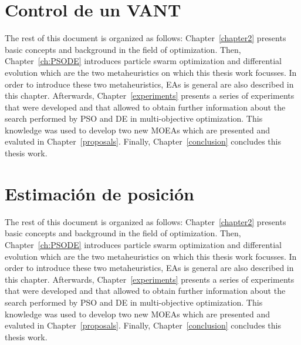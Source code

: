 \section{Control de un VANT}

The rest of this document is organized as follows: Chapter~\ref{chapter2} presents basic concepts and background in the field of optimization. Then, Chapter~\ref{ch:PSODE} introduces particle swarm optimization and differential evolution which are the two metaheuristics on which this thesis work focusses. In order to introduce these two metaheuristics, EAs is general are also described in this chapter. Afterwards, Chapter~\ref{experiments} presents a series of experiments that were developed and that allowed to obtain further information about the search performed by PSO and DE in multi-objective optimization. This knowledge was used to develop two new MOEAs which are presented and evaluted in Chapter~\ref{proposals}. Finally, Chapter~\ref{conclusion} concludes this thesis work.

\section{Estimación de posición}

The rest of this document is organized as follows: Chapter~\ref{chapter2} presents basic concepts and background in the field of optimization. Then, Chapter~\ref{ch:PSODE} introduces particle swarm optimization and differential evolution which are the two metaheuristics on which this thesis work focusses. In order to introduce these two metaheuristics, EAs is general are also described in this chapter. Afterwards, Chapter~\ref{experiments} presents a series of experiments that were developed and that allowed to obtain further information about the search performed by PSO and DE in multi-objective optimization. This knowledge was used to develop two new MOEAs which are presented and evaluted in Chapter~\ref{proposals}. Finally, Chapter~\ref{conclusion} concludes this thesis work.




